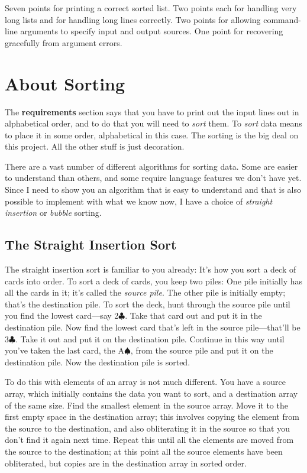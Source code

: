 Seven points for printing a correct sorted list.  Two points each for
handling very long lists and for handling long lines correctly.  Two
points for allowing command-line arguments to specify input and output
sources.  One point for recovering gracefully from argument errors.

\section{About Sorting}
\label{sorting}

The {\bf requirements} section says that you have to print out the input
lines out in alphabetical order, and to do that you will need to {\em
sort}\/ them.  To {\em sort}\/ data means to place it in some order,
alphabetical in this case.  The sorting is the big deal on this project.
All the other stuff is just decoration.

There are a vast number of different algorithms for sorting data.  Some
are easier to understand than others, and some require language
features we don't have yet.   Since I need to show you an algorithm that
is easy to understand and that is also possible to implement with what
we know now, I have a choice of {\em straight insertion} or {\em bubble}
sorting.  

\subsection{The Straight Insertion Sort}

The straight insertion sort is familiar to you already:  It's how you
sort a deck of cards into order.  To sort a deck of cards, you keep two
piles:  One pile initially has all the cards in it; it's called the
{\em source pile}\/.  The other pile is initially empty; that's the
{destination pile}\/.  To sort the deck, hunt through the source pile
until you find the lowest card---say 2$\clubsuit$.   Take that
card out and put it in the destination pile.  Now find the lowest card
that's left in the source pile---that'll be 3$\clubsuit$.  Take it out
and put it on the destination pile.  Continue in this way until you've
taken the last card, the A$\spadesuit$, from the source pile and put it
on the destination pile.  Now the destination pile is sorted. 

To do this with elements of an array is not much different.  You have a
source array, which initially contains the data you want to sort, and a
destination array of the same size.  Find the smallest element in the
source array.  Move it to the first empty space in the destination
array; this involves copying the element from the source to the
destination, and also obliterating it in the source so that you don't
find it again next time.  Repeat this until all the elements are moved
from the source to the destination; at this point all the source
elements have been obliterated, but copies are in the destination array
in sorted order.

